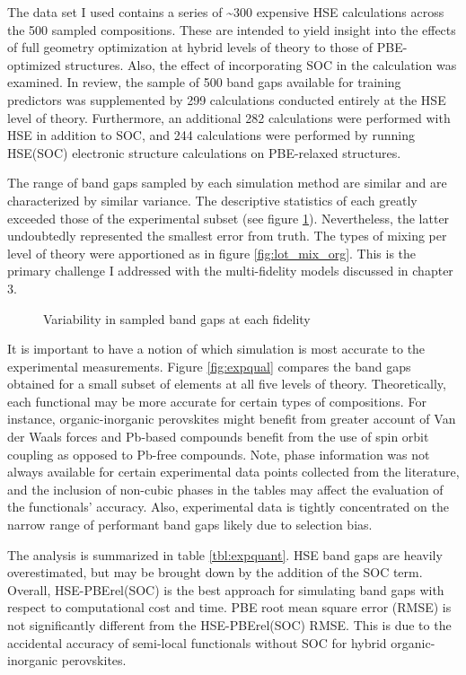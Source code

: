 The data set I used contains a series of \textasciitilde{}300 expensive HSE calculations across the 500 sampled compositions.
These are intended to yield insight into the effects of full geometry optimization at hybrid levels of theory to those of PBE-optimized structures.
Also, the effect of incorporating SOC in the calculation was examined.
In review, the sample of 500 band gaps available for training predictors was supplemented by 299 calculations conducted entirely at the HSE level of theory.
Furthermore, an additional 282 calculations were performed with HSE in addition to SOC, and 244 calculations were performed by running HSE(SOC) electronic structure calculations on PBE-relaxed structures.

The range of band gaps sampled by each simulation method are similar and are characterized by similar variance.
The descriptive statistics of each greatly exceeded those of the experimental subset (see figure \ref{fig:bg_dist}).
Nevertheless, the latter undoubtedly represented the smallest error from truth.
The types of mixing per level of theory were apportioned as in figure \ref{fig:lot_mix_org}.
This is the primary challenge I addressed with the multi-fidelity models discussed in chapter 3.

 
\begin{figure}[htbp]
\centering

\caption{\label{fig:bg_dist} Variability in sampled band gaps at each fidelity}
\end{figure}

It is important to have a notion of which simulation is most accurate to the experimental measurements.
Figure \ref{fig:expqual} compares the band gaps obtained for a small subset of elements at all five levels of theory.
Theoretically, each functional may be more accurate for certain types of compositions.
For instance, organic-inorganic perovskites might benefit from greater account of Van der Waals forces and Pb-based compounds benefit from the use of spin orbit coupling as opposed to Pb-free compounds.
Note, phase information was not always available for certain experimental data points collected from the literature, and the inclusion of non-cubic phases in the tables may affect the evaluation of the functionals' accuracy.
Also, experimental data is tightly concentrated on the narrow range of performant band gaps likely due to selection bias.

The analysis is summarized in table \ref{tbl:expquant}.
HSE band gaps are heavily overestimated, but may be brought down by the addition of the SOC term.
Overall, HSE-PBErel(SOC) is the best approach for simulating band gaps with respect to computational cost and time.
PBE root mean square error (RMSE) is not significantly different from the HSE-PBErel(SOC) RMSE.
This is due to the accidental accuracy of semi-local functionals without SOC for hybrid organic-inorganic perovskites.
\autocite{mannodi-kanakkithodi-2019-compr-comput,mannodi-kanakkithodi-2022-data-driven}

